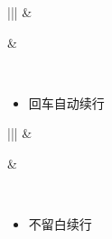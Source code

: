 \documentclass[a4paper,10pt,english]{sphinxmanual}
\begin{document}
\begin{savenotes}\sphinxattablestart
\centering
\begin{tabular}[t]{|||}
\hline
{}\relax &\relax \\
\hline\begin{sphinxfigure-in-table}
\centering

\noindent{}
\end{sphinxfigure-in-table}\relax
&\begin{sphinxfigure-in-table}
\centering

\noindent{}
\end{sphinxfigure-in-table}\relax
\\
\hline
\end{tabular}
\par
\sphinxattableend\end{savenotes}
\begin{itemize}
\item {} 
回车自动续行

\end{itemize}


\begin{savenotes}\sphinxattablestart
\centering
\begin{tabular}[t]{|||}
\hline
{}\relax &\relax \\
\hline\begin{sphinxfigure-in-table}
\centering

\noindent{}
\end{sphinxfigure-in-table}\relax
&\begin{sphinxfigure-in-table}
\centering

\noindent{}
\end{sphinxfigure-in-table}\relax
\\
\hline
\end{tabular}
\par
\sphinxattableend\end{savenotes}
\begin{itemize}
\item {} 
不留白续行

\end{itemize}
\end{document}
